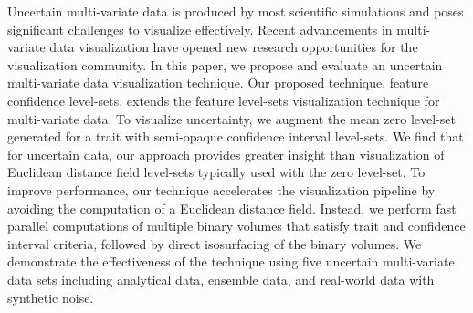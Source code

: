 Uncertain multi-variate data is produced by most scientific simulations and poses significant challenges to visualize effectively.
%
Recent advancements in multi-variate data visualization have opened new research opportunities for the visualization community.
%
In this paper, we propose and evaluate an uncertain multi-variate data visualization technique.
%
Our proposed technique, feature confidence level-sets, extends the feature level-sets visualization technique for multi-variate data.
%
To visualize uncertainty, we augment the mean zero level-set generated for a trait with semi-opaque confidence interval level-sets.
%
We find that for uncertain data, our approach provides greater insight than visualization of Euclidean distance field level-sets typically used with the zero level-set.
%
To improve performance, our technique accelerates the visualization pipeline by avoiding the computation of a Euclidean distance field. 
%
Instead, we perform fast parallel computations of multiple binary volumes that satisfy trait and confidence interval criteria, followed by direct isosurfacing of the binary volumes.
%
We demonstrate the effectiveness of the technique using five uncertain multi-variate data sets including analytical data, ensemble data, and real-world data with synthetic noise.
